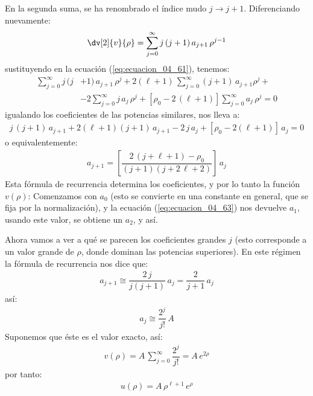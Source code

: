 En la segunda suma, se ha renombrado el índice mudo $j \to j + 1$. Diferenciando nuevamente:
\begin{align*}
\dv[2]{v}{\rho} = \sum_{j=0}^{\infty} j \, (j+1) \, a_{j+1} \, \rho^{j-1}
\end{align*}
sustituyendo en la ecuación (\ref{eq:ecuacion_04_61}), tenemos:
\begin{align*}
\sum_{j=0}^{\infty} j \, (j &+ 1) \, a_{j+1} \, \rho^{j} + 2 (\ell + 1) \, \sum_{j=0}^{\infty} (j + 1) \, a_{j+1} \rho^{j} + \\[0.5em]
&- 2 \sum_{j=0}^{\infty} j \, a_{j} \, \rho^{j} + [ \rho_{0} - 2 \, (\ell + 1)] \sum_{j=0}^{\infty} a_{j} \, \rho^{j} = 0
\end{align*}
igualando los coeficientes de las potencias similares, nos lleva a:
\begin{align*}
j \, (j + 1) \, a_{j+1} + 2(\ell + 1)(j + 1) \, a_{j+1} - 2 \, j \, a_{j} + [\rho_{0} - 2(\ell + 1)] \, a_{j} = 0
\end{align*}
o equivalentemente:
\begin{align}
a_{j+1} = \left[ \dfrac{2 \, (j + \ell + 1) - \rho_{0}}{(j + 1)(j + 2 \, \ell + 2)} \right] \, a_{j}
\label{eq:ecuacion_04_63}
\end{align}
Esta fórmula de recurrencia determina los coeficientes, y por lo tanto la función $v(\rho)$: Comenzamos con $a_{0}$ (esto se convierte en una constante en general, que se fija por la normalización), y la ecuación (\ref{eq:ecuacion_04_63}) nos devuelve $a_{1}$, usando este valor, se obtiene un $a_{2}$, y así.
\par
Ahora vamos a ver a qué se parecen los coeficientes grandes $j$ (esto corresponde a un valor grande de $\rho$, donde dominan las potencias superiores). En este régimen la fórmula de recurrencia nos dice que:
\begin{align*}
a_{j+1} \cong \dfrac{2 \, j}{j (j + 1)} \, a_{j} =  \dfrac{2}{j + 1} \, a_{j}
\end{align*}
así:
\begin{align}
a_{j} \cong \dfrac{2^{j}}{j!} \, A
\label{eq:ecuacion_04_64}
\end{align}
Suponemos que éste es el valor exacto, así:
\begin{align*}
v(\rho) = A \, \sum_{j=0}^{\infty} \dfrac{2^{j}}{j!} =  A \, e^{2 \rho}
\end{align*}
por tanto:
\begin{align}
u(\rho) = A \, \rho^{\ell + 1} \, e^{\rho}
\label{eq:ecuacion_04_65}
\end{align}
